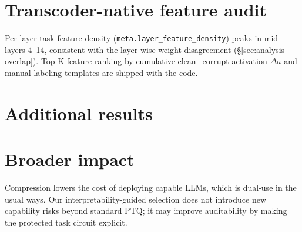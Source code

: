 \section{Transcoder-native feature audit}
\label{app:audit}
Per-layer task-feature density (\texttt{meta.layer\_feature\_density}) peaks in
mid layers 4--14, consistent with the layer-wise weight disagreement
(\S\ref{sec:analysis-overlap}). Top-K feature ranking by cumulative
clean$-$corrupt activation $\Delta a$ and manual labeling templates are
shipped with the code. 

\section{Additional results}
\label{app:additional}

\section{Broader impact}
\label{app:impact}
Compression lowers the cost of deploying capable LLMs, which is dual-use in
the usual ways. Our interpretability-guided selection does not introduce new
capability risks beyond standard PTQ; it may improve auditability by making
the protected task circuit explicit.
